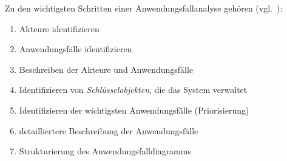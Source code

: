 \begin{tcolorbox}[title={Vorgehen bei der Anwendungsfallanalyse}]
    Zu den wichtigsten Schritten einer Anwendungsfallanalyse gehören (vgl.~\cite[Aufgabe 5.2, 88]{Buh09}):
    \begin{enumerate}
        \item Akteure identifizieren
        \item Anwendungsfälle identifizieren
        \item Beschreiben der Akteure und Anwendungsfälle
        \item Identifizieren von \textit{Schlüsselobjekten}, die das System verwaltet
        \item Identifizieren der wichtigsten Anwendungsfälle (Priorisierung)
        \item detailliertere Beschreibung der Anwendungsfälle
        \item Strukturierung des Anwendungsfalldiagramms
    \end{enumerate}
\end{tcolorbox}
